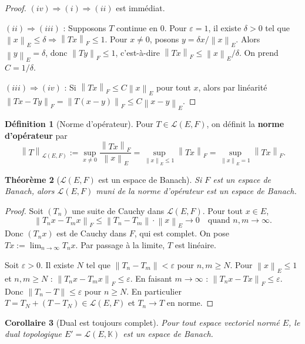 \documentclass[a4paper,12pt]{book}
\newcommand{\K}{\mathbb{K}}
\newcommand{\norm}[1]{\left\| #1 \right\|}
\theoremstyle{definition}
\newtheorem{definition}{Définition}[chapter]
\theoremstyle{plain}
\newtheorem{theoreme}[definition]{Théorème}
\newtheorem{corollaire}[definition]{Corollaire}
\theoremstyle{remark}
\begin{document}
\begin{proof}
$(iv) \Rightarrow (i) \Rightarrow (ii)$ est immédiat.

$(ii) \Rightarrow (iii)$ : Supposons $T$ continue en $0$. Pour $\varepsilon = 1$, il
existe $\delta > 0$ tel que $\norm{x}_E \leq \delta \Rightarrow \norm{Tx}_F \leq 1$.
Pour $x \neq 0$, posons $y = \delta x / \norm{x}_E$. Alors $\norm{y}_E = \delta$, donc
$\norm{Ty}_F \leq 1$, c'est-à-dire $\norm{Tx}_F \leq \norm{x}_E / \delta$.
On prend $C = 1/\delta$.

$(iii) \Rightarrow (iv)$ : Si $\norm{Tx}_F \leq C\norm{x}_E$ pour tout $x$, alors par
linéarité $\norm{Tx - Ty}_F = \norm{T(x-y)}_F \leq C\norm{x-y}_E$.
\end{proof}

\begin{definition}[Norme d'opérateur]\label{def:norme-operateur}
Pour $T \in \mathcal{L}(E,F)$, on définit la \textbf{norme d'opérateur} par
\[
    \norm{T}_{\mathcal{L}(E,F)} := \sup_{x \neq 0} \frac{\norm{Tx}_F}{\norm{x}_E}
    = \sup_{\norm{x}_E \leq 1} \norm{Tx}_F
    = \sup_{\norm{x}_E = 1} \norm{Tx}_F.
\]
\end{definition}

\begin{theoreme}[$\mathcal{L}(E,F)$ est un espace de Banach]\label{thm:LEF-banach}
Si $F$ est un espace de Banach, alors $\mathcal{L}(E,F)$ muni de la norme d'opérateur
est un espace de Banach.
\end{theoreme}

\begin{proof}
Soit $(T_n)$ une suite de Cauchy dans $\mathcal{L}(E,F)$. Pour tout $x \in E$,
\[
    \norm{T_n x - T_m x}_F \leq \norm{T_n - T_m} \cdot \norm{x}_E \to 0
    \quad \text{quand } n,m \to \infty.
\]
Donc $(T_n x)$ est de Cauchy dans $F$, qui est complet. On pose
$Tx := \lim_{n\to\infty} T_n x$. Par passage à la limite, $T$ est linéaire.

Soit $\varepsilon > 0$. Il existe $N$ tel que $\norm{T_n - T_m} < \varepsilon$ pour
$n,m \geq N$. Pour $\norm{x}_E \leq 1$ et $n,m \geq N$ :
$\norm{T_n x - T_m x}_F \leq \varepsilon$.
En faisant $m \to \infty$ : $\norm{T_n x - Tx}_F \leq \varepsilon$. Donc
$\norm{T_n - T} \leq \varepsilon$ pour $n \geq N$. En particulier
$T = T_N + (T - T_N) \in \mathcal{L}(E,F)$ et $T_n \to T$ en norme.
\end{proof}

\begin{corollaire}[Dual est toujours complet]\label{cor:dual-banach}
Pour tout espace vectoriel normé $E$, le dual topologique
$E' = \mathcal{L}(E, \K)$ est un espace de Banach.
\end{corollaire}
\end{document}
